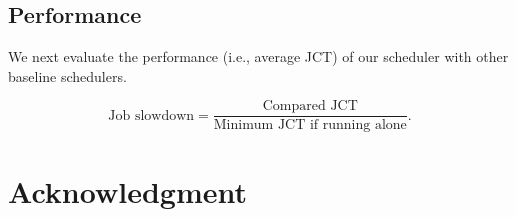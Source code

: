 \documentclass[10pt, conference, letterpaper]{IEEEtran}
\begin{document}
\subsection{Performance}
We next evaluate the performance (i.e., average JCT) of our scheduler with other baseline schedulers.

\[\text{Job slowdown} = \frac{\text{Compared JCT}}{\text{Minimum JCT if running alone}}.\]

\section*{Acknowledgment}




\end{document}
